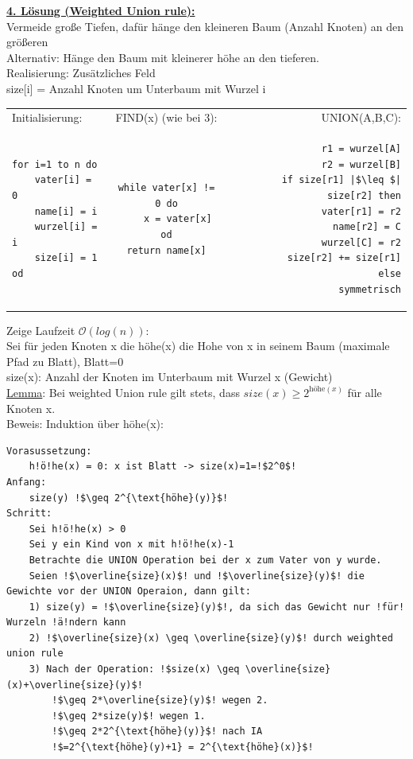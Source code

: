 \documentclass[a4paper]{article}
\newcommand{\oh}[1]{$\mathcal{O}(#1)$}
\begin{document}
\underline{\textbf{4. Lösung (Weighted Union rule):}}\\
Vermeide große Tiefen, dafür hänge den kleineren Baum (Anzahl Knoten) an den größeren\\
Alternativ: Hänge den Baum mit kleinerer höhe an den tieferen.\\
Realisierung: Zusätzliches Feld\\
size[i] = Anzahl Knoten um Unterbaum mit Wurzel i\\
\begin{tabular}{ l |c |r }
Initialisierung: & FIND(x) (wie bei 3): & UNION(A,B,C):\\
\begin{lstlisting}
for i=1 to n do
	vater[i] = 0
	name[i] = i
	wurzel[i] = i
	size[i] = 1
od
\end{lstlisting}
&
\begin{lstlisting}[escapechar=|]
while vater[x] != 0 do
	x = vater[x]
od
return name[x]
\end{lstlisting}&
\begin{lstlisting}[escapechar=|]
r1 = wurzel[A]
r2 = wurzel[B]
if size[r1] |$\leq $| size[r2] then
	vater[r1] = r2
	name[r2] = C
	wurzel[C] = r2
	size[r2] += size[r1]
else
	symmetrisch
\end{lstlisting}
\end{tabular}
Zeige Laufzeit \oh{log(n)}:\\
Sei für jeden Knoten x die höhe(x) die Hohe von x in seinem Baum (maximale Pfad zu Blatt), Blatt=0\\
size(x): Anzahl der Knoten im Unterbaum mit Wurzel x (Gewicht)\\
\underline{Lemma}: Bei weighted Union rule gilt stets, dass $size(x)\geq 2^{\text{höhe}(x)}$ für alle Knoten x.\\
Beweis: Induktion über höhe(x):\\
\begin{lstlisting}[escapechar=!]
Vorasussetzung:
	h!ö!he(x) = 0: x ist Blatt -> size(x)=1=!$2^0$!
Anfang:
	size(y) !$\geq 2^{\text{höhe}(y)}$!
Schritt:
	Sei h!ö!he(x) > 0
	Sei y ein Kind von x mit h!ö!he(x)-1
	Betrachte die UNION Operation bei der x zum Vater von y wurde.
	Seien !$\overline{size}(x)$! und !$\overline{size}(y)$! die Gewichte vor der UNION Operaion, dann gilt:
	1) size(y) = !$\overline{size}(y)$!, da sich das Gewicht nur !für! Wurzeln !ä!ndern kann
	2) !$\overline{size}(x) \geq \overline{size}(y)$! durch weighted union rule
	3) Nach der Operation: !$size(x) \geq \overline{size}(x)+\overline{size}(y)$!
		!$\geq 2*\overline{size}(y)$! wegen 2.
		!$\geq 2*size(y)$! wegen 1.
		!$\geq 2*2^{\text{höhe}(y)}$! nach IA
		!$=2^{\text{höhe}(y)+1} = 2^{\text{höhe}(x)}$!
\end{lstlisting}
\end{document}
